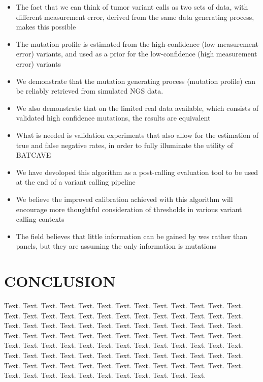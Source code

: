 \documentclass[a4,center,fleqn]{NAR}
\newcommand{\batcave}{BATCAVE }
\begin{document}
\begin{itemize}
  \item The fact that we can think of tumor variant calls as two sets of data, with different measurement error, derived from the same data generating process, makes this possible
  \item The mutation profile is estimated from the high-confidence (low measurement error) variants, and used as a prior for the low-confidence (high measurement error) variants
  \item We demonstrate that the mutation generating process (mutation profile) can be reliably retrieved from simulated NGS data.
  \item We also demonstrate that on the limited real data available, which consists of validated high confidence mutations, the results are equivalent
  \item What is needed is validation experiments that also allow for the estimation of true and false negative rates, in order to fully illuminate the utility of \batcave
  \item We have devoloped this algorithm as a post-calling evaluation tool to be used at the end of a variant calling pipeline
  \
  \item We believe the improved calibration achieved with this algorithm will encourage more thoughtful consideration of thresholds in various variant calling contexts
  \item The field believes that little information can be gained by wes rather than panels, but they are assuming the only information is mutations \cite{Hyman2015}
\end{itemize}


\section{CONCLUSION}

Text. Text. Text. Text. Text. Text. Text. Text. Text. Text. Text.
Text. Text. Text. Text. Text. Text. Text. Text. Text. Text. Text.
Text. Text. Text. Text. Text. Text. Text. Text. Text. Text. Text.
Text. Text. Text. Text. Text. Text. Text. Text. Text. Text. Text.
Text. Text. Text. Text. Text. Text. Text. Text. Text. Text. Text.
Text. Text. Text. Text. Text. Text. Text. Text. Text. Text. Text.
Text. Text. Text. Text. Text. Text. Text. Text. Text. Text. Text.
Text. Text. Text. Text. Text. Text. Text. Text. Text. Text. Text.
Text. Text. Text. Text. Text. Text. Text. Text. Text. Text. Text.
Text. Text. Text.
\end{document}

